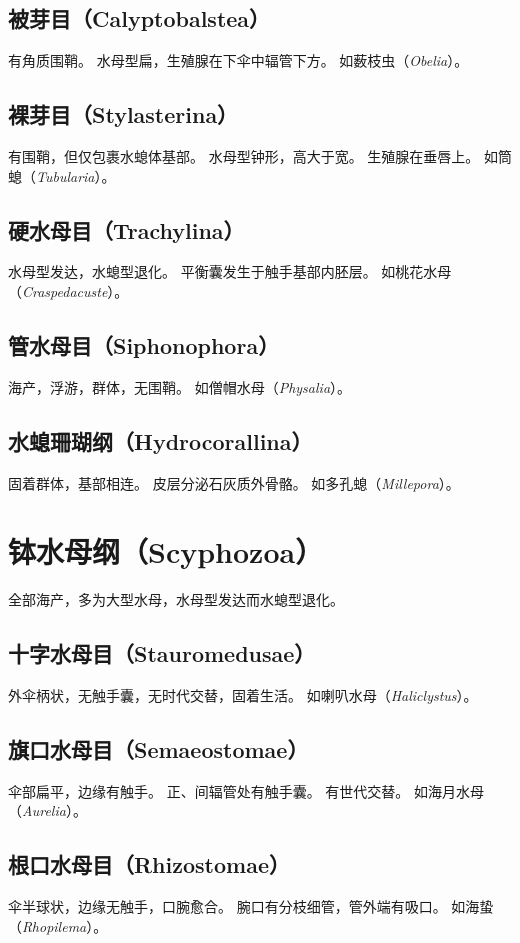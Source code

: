 \documentclass[11pt]{article}
\begin{document}
\subsection{被芽目（Calyptobalstea）}
有角质围鞘。
水母型扁，生殖腺在下伞中辐管下方。
如薮枝虫（\textit{Obelia}）。

\subsection{裸芽目（Stylasterina）}
有围鞘，但仅包裹水螅体基部。
水母型钟形，高大于宽。
生殖腺在垂唇上。
如筒螅（\textit{Tubularia}）。

\subsection{硬水母目（Trachylina）}
水母型发达，水螅型退化。
平衡囊发生于触手基部内胚层。
如桃花水母（\textit{Craspedacuste}）。

\subsection{管水母目（Siphonophora）}
海产，浮游，群体，无围鞘。
如僧帽水母（\textit{Physalia}）。

\subsection{水螅珊瑚纲（Hydrocorallina）}
固着群体，基部相连。
皮层分泌石灰质外骨骼。
如多孔螅（\textit{Millepora}）。
  
\section{钵水母纲（Scyphozoa）}
全部海产，多为大型水母，水母型发达而水螅型退化。

\subsection{十字水母目（Stauromedusae）}
外伞柄状，无触手囊，无时代交替，固着生活。
如喇叭水母（\textit{Haliclystus}）。

\subsection{旗口水母目（Semaeostomae）}
伞部扁平，边缘有触手。
正、间辐管处有触手囊。
有世代交替。
如海月水母（\textit{Aurelia}）。

\subsection{根口水母目（Rhizostomae）}
伞半球状，边缘无触手，口腕愈合。
腕口有分枝细管，管外端有吸口。
如海蛰（\textit{Rhopilema}）。
\end{document}
